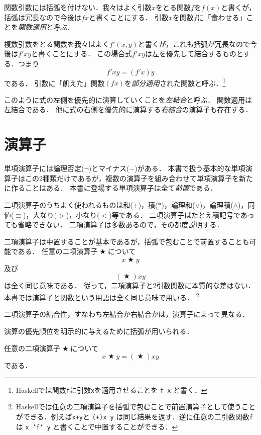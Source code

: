 \documentclass[twocolumn]{jsbook}
\newcommand{\keyword}[1]{\emph{#1}}
\newcommand{\code}[1]{\texttt{#1}}
\newenvironment{point}{\begin{screen}}{\end{screen}}
\DeclareMathOperator{\mathAnyBinaryOperator}{\bigstar}
\begin{document}
関数引数には括弧を付けない．我々はよく引数$x$をとる関数$f$を$f(x)$と書くが，括弧は冗長なので今後は$fx$と書くことにする．
引数$x$を関数$f$に「食わせる」ことを\keyword{関数適用}と呼ぶ．

複数引数をとる関数を我々はよく$f'(x,y)$と書くが，これも括弧が冗長なので今後は$f'xy$と書くことにする．
この場合式$f'xy$は左を優先して結合するものとする．つまり$$f'xy=(f'x)y$$である．
引数に「飢えた」関数$(fx)$を\keyword{部分適用}された関数と呼ぶ．\footnote{Haskellでは関数\code{f}に引数\code{x}を適用させることを \code{f x} と書く．}

このように式の左側を優先的に演算していくことを\keyword{左結合}と呼ぶ．
関数適用は左結合である．
他に式の右側を優先的に演算する\keyword{右結合}の演算子も存在する．

\section{演算子}

単項演算子には論理否定($\neg$)とマイナス($-$)がある．
本書で扱う基本的な単項演算子はこの2種類だけであるが，複数の演算子を組み合わせて単項演算子を新たに作ることはある．
本書に登場する単項演算子は全て\keyword{前置}である．

二項演算子のうちよく使われるものは和($+$)，積($*$)，論理和($\vee$)，論理積($\wedge$)，同値($\equiv$)，大なり($>$)，小なり($<$)等である．
二項演算子はたとえ積記号であっても省略できない．
二項演算子は多数あるので，その都度説明する．

二項演算子は中置することが基本であるが，括弧で包むことで前置することも可能である．
任意の二項演算子$\mathAnyBinaryOperator$について$$x\mathAnyBinaryOperator y$$及び$$(\mathAnyBinaryOperator)xy$$は全く同じ意味である．
従って，二項演算子と2引数関数に本質的な差はない．
本書では演算子と関数という用語は全く同じ意味で用いる．
\footnote{Haskellでは任意の二項演算子を括弧で包むことで前置演算子として使うことができる．例えば\code{x+y}と \code{(+)x y} は同じ結果を返す．逆に任意の二引数関数\code{f}は \code{x `f` y} と書くことで中置することができる．}

二項演算子の結合性，すなわち左結合か右結合かは，演算子によって異なる．

演算の優先順位を明示的に与えるために括弧が用いられる．

\begin{point}
任意の二項演算子$\mathAnyBinaryOperator$について$$x\mathAnyBinaryOperator y=(\mathAnyBinaryOperator)xy$$である．
\end{point}
\end{document}
